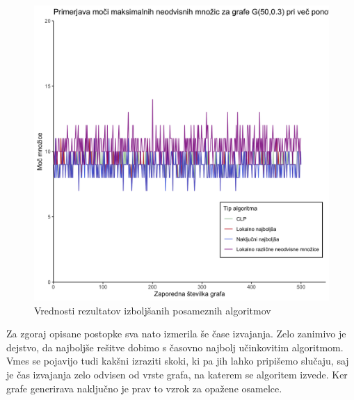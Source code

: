 \documentclass[a4paper, 12pt]{article}
\begin{document}
\begin{figure}[h!]
	\begin{center}
		\includegraphics[scale = 0.11]{R_koda/pon-moc-maximalno.png}
		\caption{Vrednosti rezultatov izboljšanih posameznih algoritmov}
	\end{center}
\end{figure}

\noindent Za zgoraj opisane postopke sva nato izmerila še čase izvajanja. Zelo zanimivo je dejstvo, da najboljše rešitve dobimo s časovno najbolj učinkovitim algoritmom.
Vmes se pojavijo tudi kakšni izraziti skoki, ki pa jih lahko pripišemo slučaju, saj je čas izvajanja zelo odvisen od vrste grafa, na katerem se algoritem izvede.
Ker grafe generirava naključno je prav to vzrok za opažene osamelce.
\end{document}
